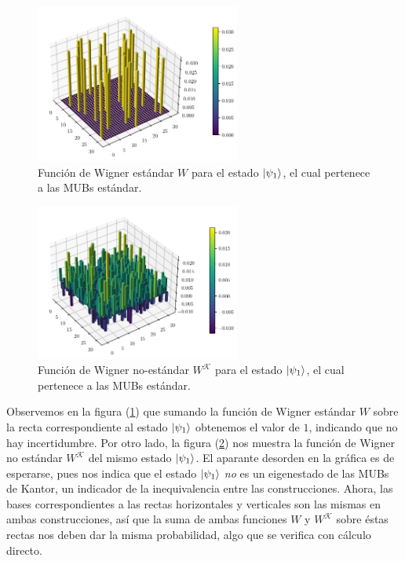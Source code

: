 \documentclass[a4paper,11pt]{report}
\begin{document}
  \begin{figure}[ht]
    \centering
    \includegraphics[width=0.6\textwidth]{
    imgs/wigner-standard-2-5-s1.png}
    \caption{Función de Wigner estándar $W$ para el estado
    $\ket{\psi_1}$, el cual pertenece a las MUBs estándar.}
    \label{fig:wigner-standard-2-5-s1}
  \end{figure}
  \begin{figure}[ht]
    \centering
    \includegraphics[width=0.6\textwidth]{
    imgs/wigner-kantor-2-5-s1.png}
    \caption{Función de Wigner no-estándar $W^{\mathcal K}$
    para el estado $\ket{\psi_1}$, el cual pertenece a las
    MUBs estándar.}
    \label{fig:wigner-kantor-2-5-s1}
  \end{figure}
  Observemos en la figura (\ref{fig:wigner-standard-2-5-s1})
  que sumando la función de Wigner estándar $W$ sobre la
  recta correspondiente al estado $\ket{\psi_1}$ obtenemos
  el valor de $1$, indicando que no hay incertidumbre. Por
  otro lado, la figura (\ref{fig:wigner-kantor-2-5-s1}) nos
  muestra la función de Wigner no estándar $W^{\mathcal K}$
  del mismo estado $\ket{\psi_1}$. El aparante desorden en
  la gráfica es de esperarse, pues nos indica que el estado
  $\ket{\psi_1}$ \textit{no} es un eigenestado de las
  MUBs de Kantor, un indicador de la inequivalencia entre
  las construcciones. Ahora, las bases correspondientes a
  las rectas horizontales y verticales son las mismas en
  ambas construcciones, así que la suma de ambas funciones
  $W$ y $W^{\mathcal K}$ sobre éstas rectas nos deben dar la
  misma probabilidad, algo que se verifica con cálculo
  directo.
\end{document}
